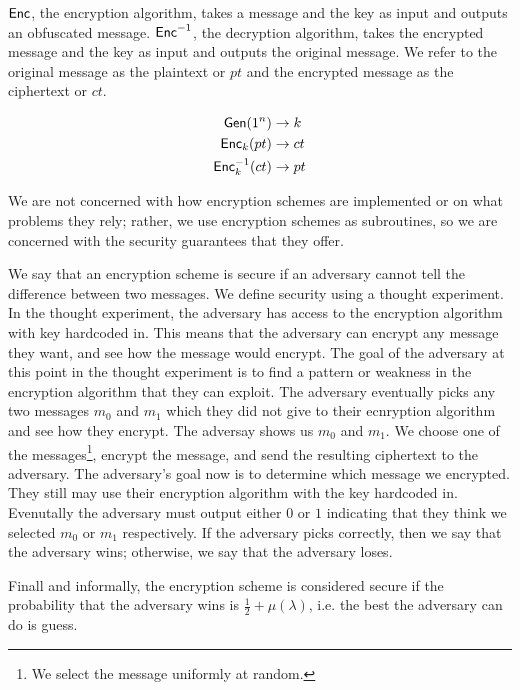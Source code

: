 $\textsf{Enc}$, the encryption algorithm, takes a message and the key as input and outputs an obfuscated message. 
$\textsf{Enc}^{-1}$, the decryption algorithm, takes the encrypted message and the key as input and outputs the original message. 
We refer to the original message as the plaintext or $pt$ and the encrypted message as the ciphertext or $ct$. 

\begin{equation}
    \label{eqn:encryption}
    \begin{split}
    	\textsf{Gen}(1^n) & \rightarrow k \\
        \textsf{Enc}_k (pt) & \rightarrow ct  \\
        \textsf{Enc}^{-1}_k(ct) & \rightarrow pt
    \end{split}
\end{equation}

We are not concerned with how encryption schemes are implemented or on what problems they rely; rather, we use encryption schemes as subroutines, so we are concerned with the security guarantees that they offer.

We say that an encryption scheme is secure if an adversary cannot tell the difference between two messages.
We define security using a thought experiment. 
In the thought experiment, the adversary has access to the encryption algorithm with key hardcoded in. 
This means that the adversary can encrypt any message they want, and see how the message would encrypt. 
The goal of the adversary at this point in the thought experiment is to find a pattern or weakness in the encryption algorithm that they can exploit.
The adversary eventually picks any two messages $m_0$ and $m_1$ which they did not give to their ecnryption algorithm and see how they encrypt.
The adversay shows us $m_0$ and $m_1$.
We choose one of the messages\footnote{We select the message uniformly at random.}, encrypt the message, and send the resulting ciphertext to the adversary.
The adversary's goal now is to determine which message we encrypted.
They still may use their encryption algorithm with the key hardcoded in.
Evenutally the adversary must output either $0$ or $1$ indicating that they think we selected $m_0$ or $m_1$ respectively.
If the adversary picks correctly, then we say that the adversary wins; otherwise, we say that the adversary loses.

Finall and informally, the encryption scheme is considered secure if the probability that the adversary wins is $\frac{1}{2} + \mu(\lambda)$, i.e. the best the adversary can do is guess.


